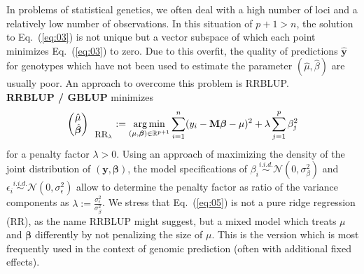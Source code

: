 \documentclass{bmcart}
\newcommand{\bb}{\bm{\beta}}
\DeclareMathOperator*{\argmin}{arg\,min}
\newcommand{\M}{\mathbf{M}}
\newcommand{\0}{\mathbf{0}}
\begin{document}
In problems of statistical genetics, we often deal with a high number of loci and a relatively low number of observations.
In this situation of $p + 1 > n$, the solution to Eq.~(\ref{eq:03}) is not unique but a vector subspace of which each point minimizes Eq.~(\ref{eq:03}) to zero.
Due to this overfit, the quality of predictions $\hat{\mathbf{y}}$ for genotypes which have not been used to estimate the parameter $(\hat{\mu},\hat{\beta})$ are usually poor. An approach to overcome this problem is RRBLUP.
\vspace{0.4cm}\\
{\bf RRBLUP / GBLUP} minimizes 
\begin{equation}\label{eq:05}
	\begin{pmatrix}
		\hat{\mu} \\
		\hat{\bm{\beta}}
	\end{pmatrix}_{\mbox{\small RR}_\lambda} :=\argmin_{(\mu,\bm{\beta}) \in \mathbb{R}^{p+1}} \sum\limits_{i=1}^n (y_i - \M\bm{\beta} - \mu)^2  + \lambda \sum\limits_{j=1}^p {\beta}_j^2
\end{equation}
for a penalty factor $\lambda > 0$. Using an approach of maximizing the density of the joint distribution of $(\mathbf{y},\bm{\beta})$, the model specifications of ${\beta_i}\stackrel{i.i.d.}{\sim} \mathcal{N}(0,\sigma_\beta^2)$ and ${\epsilon_i}\stackrel{i.i.d.}{\sim} \mathcal{N}(0,\sigma_\epsilon^2)$ allow to determine the penalty factor as ratio of the variance components  as $\lambda := \frac{\sigma_\epsilon^2}{\sigma_\beta^2}$. We stress that Eq.~(\ref{eq:05}) is not a pure ridge regression (RR), as the name RRBLUP might suggest, but a mixed model which treats $\mu$ and $\bb$ differently by not penalizing the size of $\mu$. This is the version which is most frequently used in the context of genomic prediction (often with additional fixed effects). \\
\end{document}
